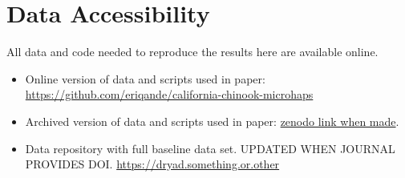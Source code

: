 \section*{Data Accessibility}

All data and code needed to reproduce the results here are available online.
\begin{itemize}
\item Online version of data and scripts used in paper: \url{https://github.com/eriqande/california-chinook-microhaps}
\item Archived version of data and scripts used in paper: \url{zenodo link when made}.
\item Data repository with full baseline data set. UPDATED WHEN JOURNAL PROVIDES DOI. \url{https://dryad.something.or.other}
\end{itemize}
\mbox{}

